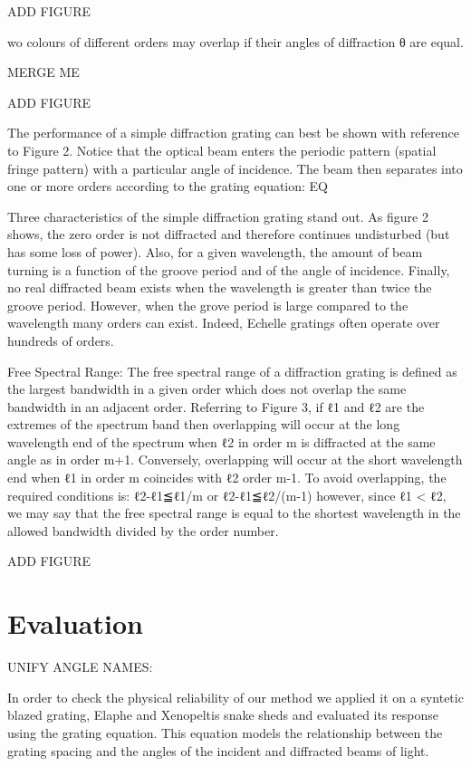 ADD FIGURE

wo colours of different orders may overlap if their angles of diffraction θ are equal. 

MERGE ME

ADD FIGURE

The performance of a simple diffraction grating can best be shown with reference to Figure 2. Notice that the optical beam enters the periodic pattern (spatial fringe pattern) with a particular angle of incidence. The beam then separates into one or more orders according to the grating equation: EQ

Three characteristics of the simple diffraction grating stand out. As figure 2 shows, the zero order is not diffracted and therefore continues undisturbed (but has some loss of power). Also, for a given wavelength, the amount of beam turning is a function of the groove period and of the angle of incidence. Finally, no real diffracted beam exists when the wavelength is greater than twice the groove period. However, when the grove period is large compared to the wavelength many orders can exist. Indeed, Echelle gratings often operate over hundreds of orders.

Free Spectral Range:
The free spectral range of a diffraction grating is defined as the largest bandwidth in a given order which does not overlap the same bandwidth in an adjacent order. Referring to Figure 3, if ℓ1 and ℓ2 are the extremes of the spectrum band then overlapping will occur at the long wavelength end of the spectrum when ℓ2 in order m is diffracted at the same angle as in order m+1. Conversely, overlapping will occur at the short wavelength end when ℓ1 in order m coincides with ℓ2 order m-1. To avoid overlapping, the required conditions is:
ℓ2-ℓ1≦ℓ1/m or ℓ2-ℓ1≦ℓ2/(m-1)
however, since ℓ1 < ℓ2, we may say that the free spectral range is equal to the shortest wavelength in the allowed bandwidth divided by the order number.

ADD FIGURE



\section{Evaluation}
UNIFY ANGLE NAMES: 

In order to check the physical reliability of our method we applied it on a syntetic blazed grating, Elaphe and Xenopeltis snake sheds and evaluated its response using the grating equation. This equation models the relationship between the grating spacing and the angles of the incident and diffracted beams of light. 

